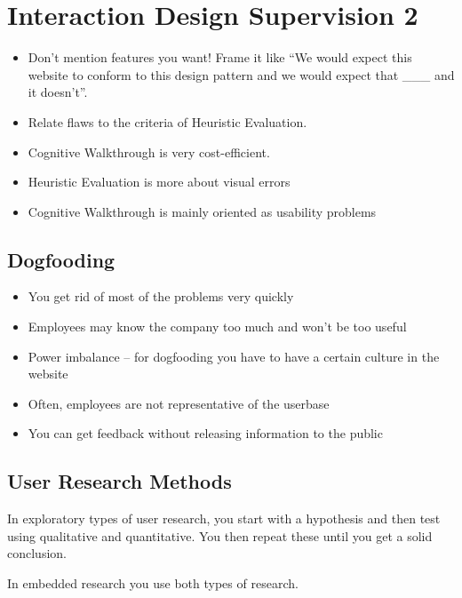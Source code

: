 \documentclass[10pt, a4paper]{article}
\begin{document}
\section{Interaction Design Supervision 2}

\begin{itemize}

\item Don't mention features you want! Frame it like ``We would expect this
website to conform to this design pattern and we would expect that \_\_\_ and it
doesn't''.

\item Relate flaws to the criteria of Heuristic Evaluation.

\item Cognitive Walkthrough is very cost-efficient.

\item Heuristic Evaluation is more about visual errors

\item Cognitive Walkthrough is mainly oriented as usability problems

\end{itemize}

\subsection*{Dogfooding}

\begin{itemize}

\item You get rid of most of the problems very quickly

\item Employees may know the company too much and won't be too useful

\item Power imbalance -- for dogfooding you have to have a certain culture in
the website

\item Often, employees are not representative of the userbase

\item You can get feedback without releasing information to the public

\end{itemize}

\subsection*{User Research Methods}

In exploratory types of user research, you start with a hypothesis and then
test using qualitative and quantitative. You then repeat these until you get
a solid conclusion.

In embedded research you use both types of research.
\end{document}

